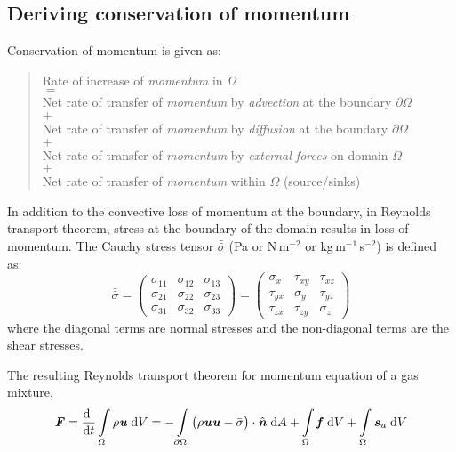\subsection{Deriving conservation of momentum}

Conservation of momentum is given as: 
\begin{quote}
	\centering
	Rate of increase of \textit{momentum} in $\Omega$\\
	$=$\\
	Net rate of transfer of \textit{momentum} by \textit{advection} at the boundary $\partial \Omega$\\
	$+$\\
	Net rate of transfer of \textit{momentum} by \textit{diffusion} at the boundary $\partial \Omega$\\
	$+$\\
	Net rate of transfer of \textit{momentum} by \textit{external forces} on domain $\Omega$\\
	$+$\\
	Net rate of transfer of \textit{momentum} within $\Omega$ (source/sinks)
\end{quote}

In addition to the convective loss of momentum at the boundary, in Reynolds transport theorem, stress at the boundary of the domain results in loss of momentum. The Cauchy stress tensor $\bar{\bar{\sigma}}$ (Pa or N\,m$^{-2}$ or kg\,m$^{-1}$\,s$^{-2}$) is defined as:
\begin{equation}
\bar{\bar{\sigma}} = \left( {\begin{array}{*{20}{c}}
	{{\sigma _{11}}}&{{\sigma _{12}}}&{{\sigma _{13}}}\\
	{{\sigma _{21}}}&{{\sigma _{22}}}&{{\sigma _{23}}}\\
	{{\sigma _{31}}}&{{\sigma _{32}}}&{{\sigma _{33}}}
	\end{array}} \right) = \left( {\begin{array}{*{20}{c}}
	{{\sigma _x}}&{{\tau _{xy}}}&{{\tau _{xz}}}\\
	{{\tau _{yx}}}&{{\sigma _y}}&{{\tau _{yz}}}\\
	{{\tau _{zx}}}&{{\tau _{zy}}}&{{\sigma _z}}
	\end{array}} \right)
\end{equation}
where the diagonal terms are normal stresses and the non-diagonal terms are the shear stresses. 



The resulting Reynolds transport theorem for momentum equation of a gas mixture, 
\begin{equation}
{\textbf{\textit{F}}} = \frac{\mathrm{d}~}{{\mathrm{d}t}} \int \limits_\Omega  {\rho }{{\textbf{\textit{u}}}}\;\mathrm{d}V =  - \int \limits_{\partial\Omega}  \left( \rho \textbf{\textit{u}}\textbf{\textit{u}} - \bar{\bar{\sigma}}\right) \cdot \hat{\textbf{\textit{n}}}\;\mathrm{d}A + \int \limits_\Omega \textbf{\textit{f}}\; \mathrm{d}V + \int \limits_\Omega \textbf{\textit{s}}_{u}\; \mathrm{d}V
\end{equation}

